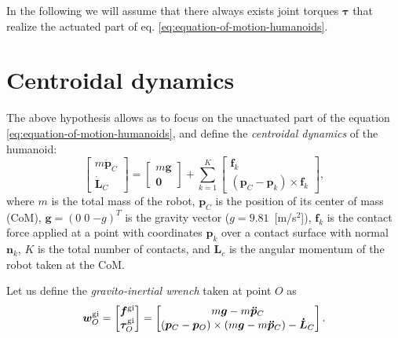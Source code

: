 In the following we will assume that there always exists joint torques
$\bm{\tau}$ that realize the actuated part of eq.
\eqref{eq:equation-of-motion-humanoids}.

\section{Centroidal dynamics}
The above hypothesis allows as to focus on the unactuated part of the equation
\eqref{eq:equation-of-motion-humanoids}, and define the
\textit{centroidal dynamics} \cite{Orin2013CentroidalDynamics} of the humanoid:
\begin{equation}
    \label{eq:centroidal-dynamics}
    \begin{bmatrix}
        m \ddot{\bm{p}}_C \\ \dot{\bm{L}}_C
    \end{bmatrix} =
    \begin{bmatrix}
        m \bm{g} \\ \bm{0}
    \end{bmatrix} +
    \sum_{k=1}^K
    \begin{bmatrix}
        \bm{f}_k \\ (\bm{p}_C - \bm{p}_k) \times \bm{f}_k
    \end{bmatrix},
\end{equation}
where $m$ is the total mass of the robot, $\bm{p}_C$ is the position of its
center of mass (CoM),
$\bm{g} = (0 \; 0 \; {-g})^T$ is the gravity vector ($g=9.81$~[m/s$^2$]), $\bm{f}_k$ is the contact force
applied at a point with coordinates $\bm{p}_k$ over a contact surface with normal
$\bm{n}_k$, $K$ is the total number of contacts, and $\bm{L}_c$ is the angular
momentum of the robot taken at the CoM.

Let us define the \textit{gravito-inertial wrench} taken at point $O$ as
\begin{equation}
    \label{eq:gravito-intertial-wrench}
    \bm{w}_O^{\rm gi}
    =
    \begin{bmatrix}
        \bm{f}^{\rm gi}\\
        \bm{\tau}_O^{\rm gi}
    \end{bmatrix}
    =
    \begin{bmatrix}
        m \bm{g} - m \bm{\ddot{p}}_C \\
        (\bm{p}_C - \bm{p}_O) \times (m \bm{g} - m \bm{\ddot{p}}_C) - \bm{\dot{L}}_C
    \end{bmatrix}.
\end{equation}

